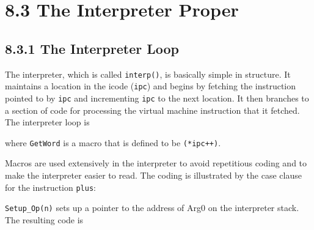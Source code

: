 \section[8.3 The Interpreter Proper]{8.3 The Interpreter Proper}
\subsection[8.3.1 The Interpreter Loop]{8.3.1 The Interpreter Loop}

The interpreter, which is called \texttt{interp()}, is basically
simple in structure. It maintains a location in the icode
(\texttt{ipc}) and begins by fetching the instruction pointed to by
\texttt{ipc} and incrementing \texttt{ipc} to the next location. It
then branches to a section of code for processing the virtual machine
instruction that it fetched. The interpreter loop is

\goodbreak
{}

\noindent
where \texttt{GetWord} is a macro that is defined to be \texttt{(*ipc++)}.

Macros are used extensively in the interpreter to avoid repetitious
coding and to make the interpreter easier to read.  The coding is
illustrated by the case clause for the instruction \texttt{plus}:

\goodbreak
{}



\texttt{Setup\_Op(n)} sets up a pointer to the address of Arg0 on the
interpreter stack. The resulting code is


